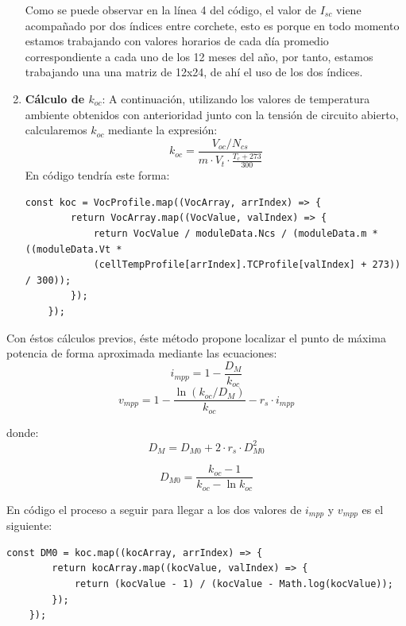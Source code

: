 \begin{enumerate}
Como se puede observar en la línea 4 del código, el valor de $I_{sc}$ viene acompañado por dos índices entre corchete, esto es porque en todo momento estamos trabajando con valores horarios de cada día promedio correspondiente a cada uno de los 12 meses del año, por tanto, estamos trabajando una una matriz de 12x24, de ahí el uso de los dos índices. 

\item \textbf{Cálculo de $k_{oc}$}: A continuación, utilizando los valores de temperatura ambiente obtenidos con anterioridad junto con la tensión de circuito abierto, calcularemos $k_{oc}$ mediante la expresión:
\begin{equation}
k_{oc} = \frac{V_{oc} / N_{cs}}{m \cdot V_t \cdot \frac{T_c + 273}{300}}
\end{equation}
En código tendría este forma:
\begin{lstlisting}[style=ES6, caption={Cálculo de $k_{oc}$}]
	const koc = VocProfile.map((VocArray, arrIndex) => {
		return VocArray.map((VocValue, valIndex) => {
			return VocValue / moduleData.Ncs / (moduleData.m * ((moduleData.Vt *
			(cellTempProfile[arrIndex].TCProfile[valIndex] + 273)) / 300));
		});
	});
\end{lstlisting} 
\end{enumerate}

Con éstos cálculos previos, éste método propone localizar el punto de máxima potencia de forma aproximada mediante las ecuaciones:
\begin{equation}
i_{mpp} = 1 - \frac{D_M}{k_{oc}}
\end{equation}
\begin{equation}
v_{mpp} = 1 - \frac{\ln(k_{oc}/D_M)}{k_{oc}}-r_s\cdot i_{mpp}
\end{equation}

donde:
\begin{equation}
D_M = D_{M0} + 2 \cdot r_s \cdot D_{M0}^2
\end{equation}

\begin{equation}
D_{M0} = \frac{k_{oc}-1}{k_{oc} - \ln k_{oc}}
\end{equation}

En código el proceso a seguir para llegar a los dos valores de $i_{mpp}$ y $v_{mpp}$ es el siguiente:

\begin{lstlisting}[style=ES6, caption={Cálculo de $D_{M0}$}]
	const DM0 = koc.map((kocArray, arrIndex) => {
		return kocArray.map((kocValue, valIndex) => {
			return (kocValue - 1) / (kocValue - Math.log(kocValue));
		});
	});
\end{lstlisting} 

